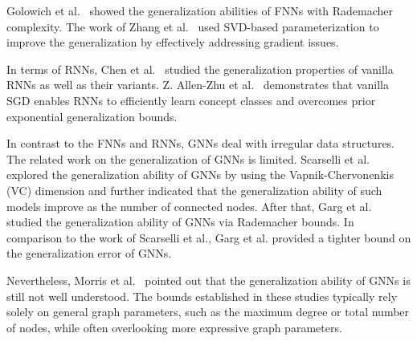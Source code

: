Golowich et al.~\cite{golowich2018size} showed the generalization abilities of FNNs with Rademacher complexity. The work of Zhang et al.~\cite{zhang2018stabilizing} used SVD-based parameterization to improve the generalization by effectively addressing gradient issues.

In terms of RNNs, Chen et al.~\cite{chen2019generalization} studied the generalization properties of vanilla RNNs as well as their variants. Z. Allen-Zhu et al.~\cite{allen2019can} demonstrates that vanilla SGD enables RNNs to efficiently learn concept classes and overcomes prior exponential generalization bounds. 

In contrast to the FNNs and RNNs, GNNs deal with irregular data structures. The related work on the generalization of GNNs is limited. Scarselli et al.~\cite{scarselli2018vapnik} explored the generalization ability of GNNs by using the Vapnik-Chervonenkis (VC) dimension and further indicated that the generalization ability of such models improve as the number of connected nodes. After that, Garg et al.~\cite{garg2020generalization} studied the generalization ability of GNNs via Rademacher bounds. In comparison to the work of Scarselli et al., Garg et al. provided a tighter bound on the generalization error of GNNs.

Nevertheless, Morris et al.~\cite{morris2024futuredirectionstheorygraph} pointed out that the generalization ability of GNNs is still not well understood. The bounds established in these studies typically rely solely on general graph parameters, such as the maximum degree or total number of nodes, while often overlooking more expressive graph parameters.